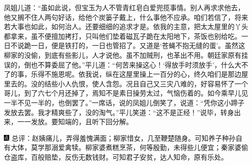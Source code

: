 凤姐儿道：``虽如此说，但宝玉为人不管青红皂白爱兜揽事情。别人再求求他去，他又搁不住人两句好话，给他个炭篓子戴上，什么事他不应承。咱们若信了，将来若大事也如此，如何治人。还要细细的追求才是。依我的主意，把太太屋里的丫头都拿来，虽不便擅加拷打，只叫他们垫着磁瓦子跪在太阳地下，茶饭也别给吃。一日不说跪一日，便是铁打的，一日也管招了。又道是`苍蝇不抱无缝的蛋'。虽然这柳家的没偷，到底有些影儿，人才说他。虽不加贼刑，也革出不用。朝廷家原有挂误的，倒也不算委屈了他。''平儿道：``何苦来操这心！`得放手时须放手'，什么大不了的事，乐得不施恩呢。依我说，纵在这屋里操上一百分的心，终久咱们是那边屋里去的。没的结些小人仇恨，使人含怨。况且自己又三灾八难的，好容易怀了一个哥儿，到了六七个月还掉了，焉知不是素日操劳太过，气恼伤着的。如今乘早儿见一半不见一半的，也倒罢了。''一席话，说的凤姐儿倒笑了，说道：``凭你这小蹄子发放去罢。我才精爽些了，没的淘气。''平儿笑道：``这不是正经！''说毕，转身出来，一一发放。要知端的，且听下回分解。

{\includegraphics[width=3mm]{../Images/00005}  \kaishu 总评：赵姨痛儿，弄得羞愧满面；柳家惜女，几至鞭楚随身。可知养子种孙自有大体，莫学那溺爱禽犊。柳家婆煮糕烹茶，何等殷勤，未得些儿便宜；秦家婆偷仓盗库，百般赔垫，反伤无数钱财。可知君子安贫，达人知命，原有乐处。}

